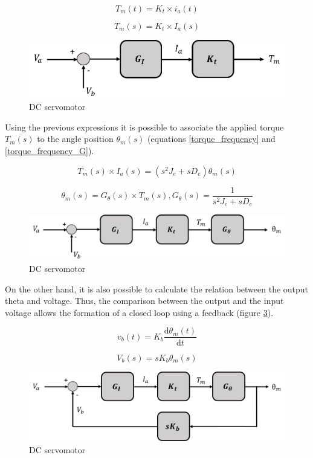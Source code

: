 \begin{equation}\label{torque_curr1}
T_{m}(t)= K_{t}\times i_{a}(t)
\end{equation}

\begin{equation}\label{torque_curr2}
T_{m}(s)= K_{t}\times I_{a}(s)
\end{equation}

\begin{figure}[H]
\centering
\includegraphics[scale=0.6]{figures/model2.png}
\caption{DC servomotor}
\label{model2}
\end{figure}

Using the previous expressions it is possible to associate the applied torque $T_{m}(s)$ to the angle position $\theta_{m}(s)$ (equations \ref{torque_frequency} and \ref{torque_frequency_G}).

\begin{equation}\label{torque_frequency}
T_{m}(s)\times I_{a}(s)= (s^{2}J_{e} + sD_{e})\theta_{m}(s)
\end{equation}

\begin{equation}\label{torque_frequency_G}
\theta_{m}(s)= G_{\theta}(s)\times T_{m}(s) , G_{\theta}(s)=\frac{1}{s^{2}J_{e} + sD_{e}}
\end{equation}

\begin{figure}[H]
\centering
\includegraphics[scale=0.6]{figures/model3.png}
\caption{DC servomotor}
\label{model3}
\end{figure}

On the other hand, it is also possible to calculate the relation between the output theta and voltage. Thus, the comparison between the output and the input voltage allows the formation of a closed loop using a feedback (figure \ref{model4}).

\begin{equation}\label{feedback1}
v_{b}(t)= K_{b}\frac{\mathrm{d} \theta_{m}(t)}{\mathrm{d} t}
\end{equation}

\begin{equation}\label{feedback2}
V_{b}(s)= sK_{b}\theta_{m}(s)
\end{equation}

\begin{figure}[H]
\centering
\includegraphics[scale=0.6]{figures/model4.png}
\caption{DC servomotor}
\label{model4}
\end{figure}


